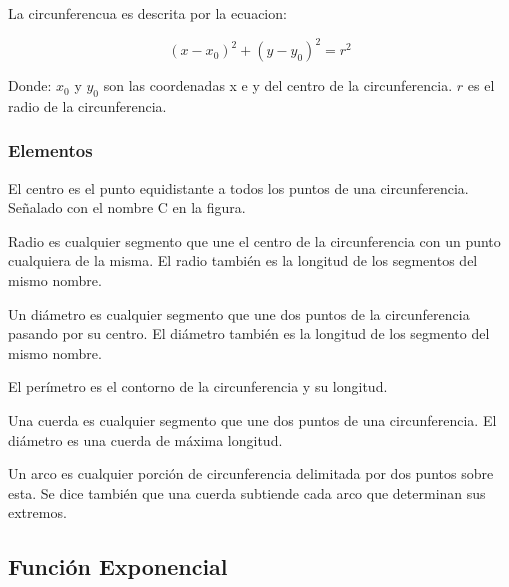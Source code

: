     La circunferencua es descrita por la ecuacion:


    $$ (x-x_0)^2+(y-y_0)^2 = r^2 $$


    Donde: $x_0$ y $y_0$ son las coordenadas x e y del centro de la circunferencia.
    $r$ es el radio de la circunferencia.

    \subsubsection*{Elementos} \label{Elementos}

    El centro es el punto equidistante a todos los puntos de una
    circunferencia. Señalado con el nombre  C en la figura.

    Radio es cualquier segmento que une el centro de la circunferencia con
    un punto cualquiera de la misma. El radio también es la longitud de los
    segmentos del mismo nombre.

    Un  diámetro es cualquier segmento que une dos puntos de la circunferencia
    pasando por su centro. El diámetro también es la longitud de los segmento
    del mismo nombre.

    El perímetro es el contorno de la circunferencia y su longitud.

    Una cuerda es cualquier segmento que une dos puntos de una circunferencia.
    El diámetro es una cuerda de máxima longitud.

    Un arco es cualquier porción de circunferencia delimitada por dos puntos
    sobre esta. Se dice también que una cuerda subtiende cada arco que
    determinan sus extremos.





\subsection{Función Exponencial}

